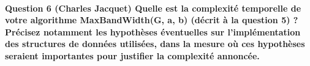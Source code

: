 \documentclass[a4paper]{article}
\begin{document}
\paragraph{Question 6 (Charles Jacquet) Quelle est la complexité temporelle de votre algorithme MaxBandWidth(G, a, b) (décrit à la question 5) ? Précisez notamment les hypothèses éventuelles sur l’implémentation des structures de données utilisées, dans la mesure où ces hypothèses seraient importantes pour justifier la complexité annoncée.}
\end{document}

